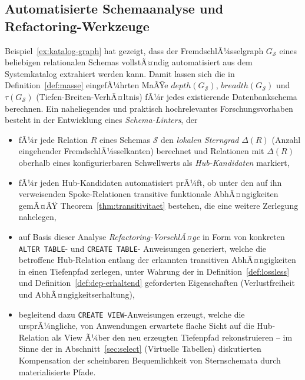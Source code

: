 ﻿\documentclass[a4paper,12pt]{report}
\theoremstyle{definition}
\theoremstyle{remark}
\newcommand{\depth}{\mathit{depth}}
\newcommand{\breadth}{\mathit{breadth}}
\begin{document}
\subsection{Automatisierte Schemaanalyse und Refactoring-Werkzeuge}
\label{sec:ausblick-tooling}

Beispiel~\ref{ex:katalog-graph} hat gezeigt, dass der
FremdschlÃ¼sselgraph $G_{\mathcal{S}}$ eines beliebigen relationalen
Schemas vollstÃ¤ndig automatisiert aus dem Systemkatalog extrahiert
werden kann. Damit lassen sich die in
Definition~\ref{def:masse} eingefÃ¼hrten MaÃŸe $\depth(G_{\mathcal{S}})$,
$\breadth(G_{\mathcal{S}})$ und $\tau(G_{\mathcal{S}})$
(Tiefen-Breiten-VerhÃ¤ltnis) fÃ¼r jedes existierende Datenbankschema
berechnen. Ein naheliegendes und praktisch hochrelevantes
Forschungsvorhaben besteht in der Entwicklung eines
\emph{Schema-Linters}, der

\begin{itemize}
  \item fÃ¼r jede Relation $R$ eines Schemas $\mathcal{S}$ den
    \emph{lokalen Sterngrad} $\Delta(R)$ (Anzahl eingehender
    FremdschlÃ¼sselkanten) berechnet und Relationen mit $\Delta(R)$
    oberhalb eines konfigurierbaren Schwellwerts als
    \emph{Hub-Kandidaten} markiert,
  \item fÃ¼r jeden Hub-Kandidaten automatisiert prÃ¼ft, ob unter den auf
    ihn verweisenden Spoke-Relationen transitive funktionale
    AbhÃ¤ngigkeiten gemÃ¤ÃŸ Theorem~\ref{thm:transitivitaet} bestehen, die
    eine weitere Zerlegung nahelegen,
  \item auf Basis dieser Analyse \emph{Refactoring-VorschlÃ¤ge} in Form
    von konkreten \texttt{ALTER TABLE}- und \texttt{CREATE TABLE}-
    Anweisungen generiert, welche die betroffene Hub-Relation entlang
    der erkannten transitiven AbhÃ¤ngigkeiten in einen Tiefenpfad
    zerlegen, unter Wahrung der in Definition~\ref{def:lossless} und
    Definition~\ref{def:dep-erhaltend} geforderten Eigenschaften
    (Verlustfreiheit und AbhÃ¤ngigkeitserhaltung),
  \item begleitend dazu \texttt{CREATE VIEW}-Anweisungen erzeugt, welche
    die ursprÃ¼ngliche, von Anwendungen erwartete flache Sicht auf die
    Hub-Relation als View Ã¼ber den neu erzeugten Tiefenpfad
    rekonstruieren -- im Sinne der in
    Abschnitt~\ref{sec:select} (\glqq Virtuelle Tabellen\grqq{})
    diskutierten Kompensation der scheinbaren Bequemlichkeit von
    Sternschemata durch materialisierte Pfade.
\end{itemize}
\end{document}
